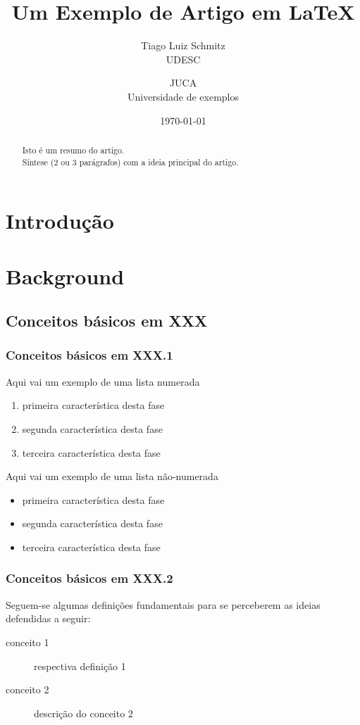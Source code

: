\documentclass[a4paper,12pt]{article}
\title{Um Exemplo de Artigo em \LaTeX}
\author{Tiago Luiz Schmitz\\UDESC
        \and 
        JUCA\\Universidade de exemplos}
\date{\today}
\begin{document}
\maketitle

\begin{abstract}
\noindent Isto é um resumo do artigo.\\
Síntese (2 ou 3 parágrafos) com a ideia principal do artigo.
\end{abstract}


\section{Introdução}

\section{Background}
\subsection{Conceitos básicos em XXX}
\subsubsection{Conceitos básicos em XXX.1}
Aqui vai um exemplo de uma lista numerada
\begin{enumerate}
\item primeira característica desta fase
\item segunda característica desta fase
\item terceira característica desta fase
\end{enumerate}

Aqui vai um exemplo de uma lista não-numerada
\begin{itemize}
\item primeira característica desta fase
\item segunda característica desta fase
\item terceira característica desta fase
\end{itemize}

\subsubsection{Conceitos básicos em XXX.2}
Seguem-se algumas definições fundamentais para se perceberem as ideias 
defendidas a seguir:
\begin{description}
\item[conceito 1] respectiva definição 1
\item[conceito 2] descrição do  conceito 2
\end{description}
\end{document}
